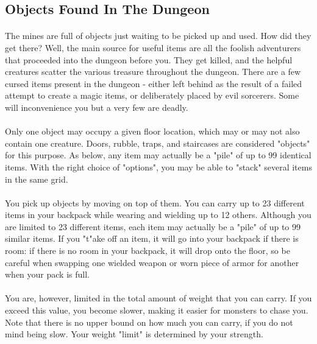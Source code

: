 \subsection{Objects Found In The Dungeon}
\paragraph{}The mines are full of objects just waiting to be picked up and used. How
did they get there? Well, the main source for useful items are all the
foolish adventurers that proceeded into the dungeon before you. They get
killed, and the helpful creatures scatter the various treasure throughout
the dungeon. There are a few cursed items present in the dungeon -
either left behind as the result of a failed attempt to create a magic items,
or deliberately placed by evil sorcerers. Some will inconvenience you but
a very few are deadly.

\paragraph{}Only one object may occupy a given floor location, which may or may not also
contain one creature. Doors, rubble, traps, and staircases are considered
"objects" for this purpose. As below, any item may actually be a "pile" of
up to 99 identical items. With the right choice of "options", you may be
able to "stack" several items in the same grid.

\paragraph{}You pick up objects by moving on top of them. You can carry up to 23
different items in your backpack while wearing and wielding up to 12 others.
Although you are limited to 23 different items, each item may actually be a
"pile" of up to 99 similar items. If you "t"ake off an item, it will go
into your backpack if there is room: if there is no room in your backpack,
it will drop onto the floor, so be careful when swapping one wielded weapon
or worn piece of armor for another when your pack is full.

\paragraph{}You are, however, limited in the total amount of weight that you can carry.
If you exceed this value, you become slower, making it easier for monsters
to chase you. Note that there is no upper bound on how much you can carry,
if you do not mind being slow. Your weight "limit" is determined by your
strength.

